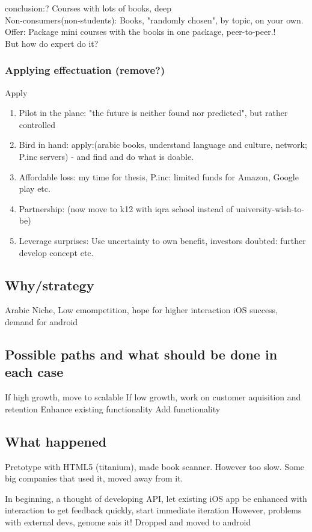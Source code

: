 \documentclass[a4paper,10pt]{book}
\begin{document}
conclusion:?
Courses with lots of books, deep\\
Non-consumers(non-students): Books, "randomly chosen", by topic, on your own.\\
Offer: Package mini courses with the books in one package, peer-to-peer.!
\\
But how do expert do it?


\subsubsection{Applying effectuation (remove?)}
Apply
\begin{enumerate}
 \item Pilot in the plane: "the future is neither found nor predicted", but rather controlled 
 \item Bird in hand: apply:(arabic books, understand language and culture, network; P.inc servers) - and find and do what is doable.
 \item Affordable loss: my time for thesis, P.inc: limited funds for Amazon, Google play etc. 
 \item Partnership: (now move to k12 with iqra school instead of university-wish-to-be)
 \item Leverage surprises: Use uncertainty to own benefit, investors doubted: further develop concept etc.
\end{enumerate}

\subsection{Why/strategy}

 Arabic Niche, Low cmompetition, hope for higher interaction
 iOS success, demand for android

\subsection{Possible paths and what should be done in each case}
If high growth, move to scalable
If low growth, work on customer aquisition and retention
Enhance existing functionality
Add functionality 

\subsection{What happened}
Pretotype with HTML5 (titanium), made book scanner. However too slow.
Some big companies that used it, moved away from it.


In beginning, a thought of developing API, let existing iOS app be enhanced with interaction to get feedback quickly, start immediate iteration
However, problems with external devs, genome sais it!
Dropped and moved to android
\end{document}
